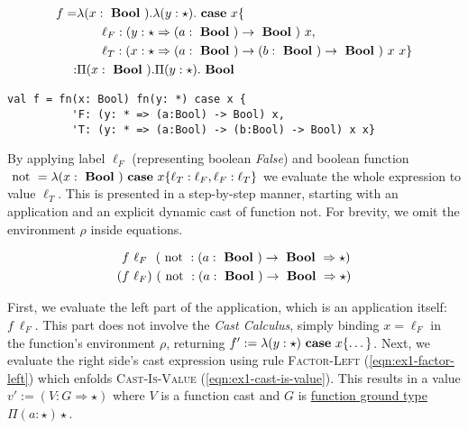 \begin{equation}\label{eqn:ccldlc-example1}
\begin{split}
f = & \lambda (x: \text{ \textbf{Bool} })
. \lambda (y: \star )
. \text{ \textbf{case} } x \{ \\
& \qquad \ell_F: (y : \star \Rightarrow (a:\text{ \textbf{Bool} }) \rightarrow \text{ \textbf{Bool} })~x, \\
& \qquad \ell_T: (x : \star \Rightarrow (a:\text{ \textbf{Bool} }) \rightarrow (b:\text{ \textbf{Bool} }) \rightarrow \text{ \textbf{Bool} })~x~x \} \\
: & \Pi(x : \text{ \textbf{Bool} }) . \Pi (y: \star ) . \text{ \textbf{Bool} }
\end{split}
\end{equation}

\begin{lstlisting}[language=ldgv,
  label=lst:ccldgv-example1,
  caption=CCLDGV example ``dependent function cast'']
val f = fn(x: Bool) fn(y: *) case x {
          'F: (y: * => (a:Bool) -> Bool) x,
          'T: (y: * => (a:Bool) -> (b:Bool) -> Bool) x x}
\end{lstlisting}

By applying label $\ell_F$ (representing boolean \emph{False}) and boolean function $\text{ not } = \lambda (x:\text{ \textbf{Bool} }) \text{ \textbf{case} } x \{ \ell_T: \ell_F, \ell_F: \ell_T\}$ we evaluate the whole expression to value $\ell_T$. This is presented in a step-by-step manner, starting with an application and an explicit dynamic cast of function not. For brevity, we omit the environment $\rho$ inside equations.

\begin{align}
& f~\ell_F~~(\text{ not } : (a:\text{ \textbf{Bool} }) \rightarrow \text{ \textbf{Bool} } \Rightarrow \star) \\
( & f~\ell_F)~(\text{ not } : (a:\text{ \textbf{Bool} }) \rightarrow \text{ \textbf{Bool} } \Rightarrow \star)
\end{align}

First, we evaluate the left part of the application, which is an application itself: $f~\ell_F$. This part does not involve the \emph{Cast Calculus}, simply binding $x=\ell_F$ in the function's environment $\rho$, returning $f' := \lambda (y:\star) \text{ \textbf{case} } x \{ \dots \}$. Next, we evaluate the right side's cast expression using rule \textsc{Factor-Left} (\ref{eqn:ex1-factor-left}) which enfolds \textsc{Cast-Is-Value} (\ref{eqn:ex1-cast-is-value}). This results in a value $v' := (V : G \Rightarrow \star)$ where $V$ is a function cast and $G$ is \underline{function ground type} $\Pi(a:\star)\star$.

